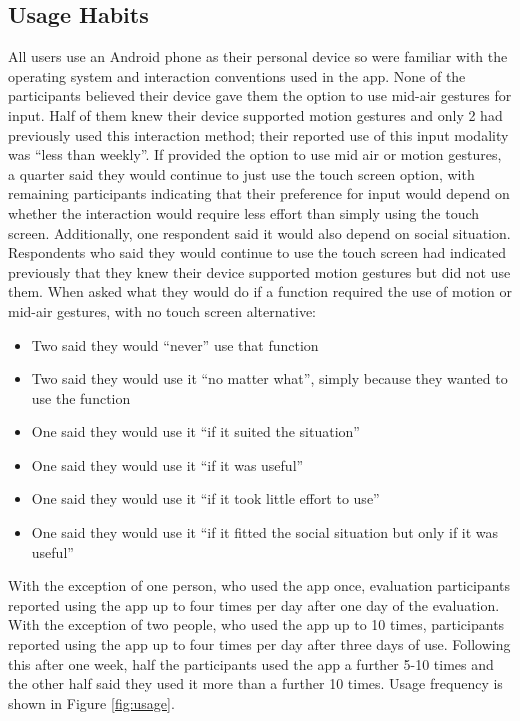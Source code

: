 \documentclass{l4proj}
\begin{document}
\subsection{Usage Habits}

All users use an Android phone as their personal device so were familiar with the operating system and interaction conventions used in the app. None of the participants believed their device gave them the option to use mid-air gestures for input. Half of them knew their device supported motion gestures and only 2 had previously used this interaction method; their reported use of this input modality was ``less than weekly''. If provided the option to use mid air or motion gestures, a quarter said they would continue to just use the touch screen option, with remaining participants indicating that their preference for input would depend on whether the interaction would require less effort than simply using the touch screen. Additionally, one respondent said it would also depend on social situation. Respondents who said they would continue to use the touch screen had indicated previously that they knew their device supported motion gestures but did not use them. When asked what they would do if a function required the use of motion or mid-air gestures, with no touch screen alternative:
\begin{itemize}
    \item Two said they would ``never'' use that function
    \item Two said they would use it ``no matter what'', simply because they wanted to use the function
    \item One said they would use it ``if it suited the situation''
    \item One said they would use it ``if it was useful''
    \item One said they would use it ``if it took little effort to use''
    \item One said they would use it ``if it fitted the social situation but only if it was useful''
\end{itemize}

With the exception of one person, who used the app once, evaluation participants reported using the app up to four times per day after one day of the evaluation. With the exception of two people, who used the app up to 10 times, participants reported using the app up to four times per day after three days of use. Following this after one week, half the participants used the app a further 5-10 times and the other half said they used it more than a further 10 times. Usage frequency is shown in Figure \ref{fig:usage}.
\end{document}

